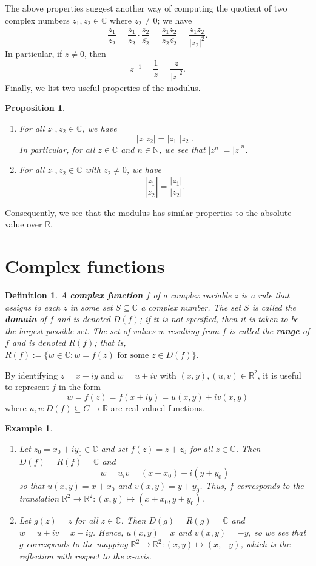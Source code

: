 \documentclass[10pt]{article}
\newcommand{\R}{\mathbb{R}}
\newcommand{\C}{\mathbb{C}}
\newcommand{\N}{\mathbb{N}}
\theoremstyle{newstyle}
\newtheorem{prop}[thm]{Proposition}
\newtheorem{defn}[thm]{Definition}
\newtheorem{exmp}[thm]{Example}
\begin{document}
The above properties suggest another way of computing the quotient of two complex 
numbers $z_1, z_2 \in \C$ where $z_2 \neq 0$; we have 
\[ \frac{z_1}{z_2} = \frac{z_1}{z_2} \cdot \frac{\overline{z_2}}{\overline{z_2}} = 
\frac{z_1\overline{z_2}}{z_2\overline{z_2}} = \frac{z_1\overline{z_2}}{|z_2|^2}. \]
In particular, if $z \neq 0$, then 
\[ z^{-1} = \frac1z = \frac{\bar{z}}{|z|^2}. \]
Finally, we list two useful properties of the modulus. 

\begin{prop}~
\begin{enumerate}[(1)]
    \item For all $z_1, z_2 \in \C$, we have 
    \[ |z_1z_2| = |z_1||z_2|. \]
    In particular, for all $z \in \C$ and $n \in \N$, we see that $|z^n| = |z|^n$. 
    \item For all $z_1, z_2 \in \C$ with $z_2 \neq 0$, we have 
    \[ \left| \frac{z_1}{z_2} \right| = \frac{|z_1|}{|z_2|}. \]
\end{enumerate}
\end{prop}

Consequently, we see that the modulus has similar properties to the absolute value over $\R$.

\newpage 
\section{Complex functions}

\begin{defn}
A {\bf complex function} $f$ of a complex variable $z$ is a rule that assigns to each $z$ in 
some set $S \subseteq \C$ a complex number. The set $S$ is called the {\bf domain} of $f$ 
and is denoted $D(f)$; if it is not specified, then it is taken to be the largest possible set.
The set of values $w$ resulting from $f$ is called the {\bf range} of $f$ and is 
denoted $R(f)$; that is, $R(f) := \{w \in \C : w=f(z) \text{ for some } z \in D(f)\}$. 
\end{defn}

By identifying $z = x+iy$ and $w = u+iv$ with $(x, y), (u, v) \in \R^2$, it is useful to 
represent $f$ in the form 
\[ w = f(z) = f(x+iy) = u(x,y) +iv(x, y) \]
where $u, v : D(f) \subseteq C \to \R$ are real-valued functions. 

\begin{exmp}~
\begin{enumerate}[(1)]
    \item Let $z_0 = x_0+iy_0 \in \C$ and set $f(z) = z+z_0$ for all $z \in \C$. Then 
    $D(f) = R(f) = \C$ and 
    \[ w = u_iv = (x+x_0) + i(y+y_0) \]
    so that $u(x, y) = x+x_0$ and $v(x,y) = y+y_0$. Thus, $f$ corresponds to the translation 
    $\R^2 \to \R^2 : (x, y) \mapsto (x+x_0, y+y_0)$. 
    \item Let $g(z) = \bar{z}$ for all $z \in \C$. Then $D(g) = R(g) = \C$ and 
    $w = u+iv = x-iy$. Hence, $u(x, y) = x$ and $v(x, y) = -y$, so we see that $g$ corresponds to the 
    mapping $\R^2 \to \R^2 : (x, y) \mapsto (x, -y)$, which is the reflection with respect to 
    the $x$-axis. 
\end{enumerate}
\end{exmp}
\end{document}
